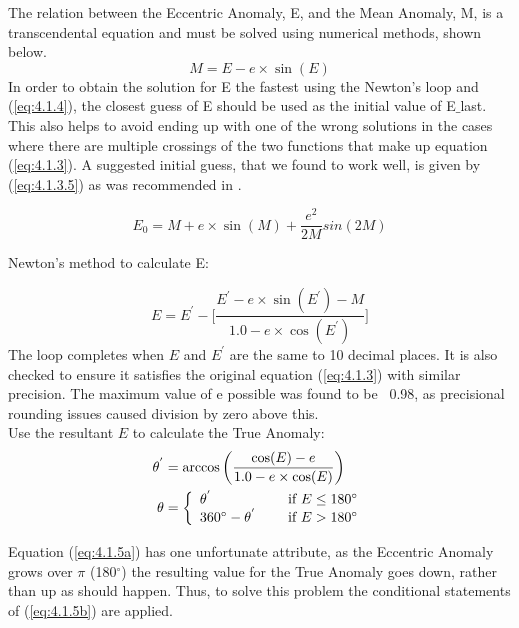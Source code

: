\documentclass[10pt,preprint]{aastex}
\begin{document}
The relation between the Eccentric Anomaly, E, and the Mean Anomaly, M, is a transcendental equation and must be solved using numerical methods, shown below.
\begin{equation}\label{eq:4.1.3}
M = E - e\times\sin(E)
\end{equation}
In order to obtain the solution for E the fastest using the Newton's loop and (\ref{eq:4.1.4}), the closest guess of E should be used as the initial value of E$\_$last.
  This also helps to avoid ending up with one of the wrong solutions in the
  cases where there are multiple crossings of the two functions that make up
  equation (\ref{eq:4.1.3}).  A suggested initial guess, that we found to work well, is given by (\ref{eq:4.1.3.5}) as was recommended in \citet{Argyle}.

\begin{equation}\label{eq:4.1.3.5}
E_0 = M+e\times\sin(M) + \frac{e^2}{2M}sin(2M)
\end{equation}

Newton's method to calculate E:
  
\begin{equation}\label{eq:4.1.4}
E = E^{'} - \bigg[\frac{E^{'} - e \times \sin(E^{'}) - M}{1.0 - e \times \cos(E^{'})}\bigg]
\end{equation}
The loop completes when $E$ and $E^{'}$ are the same to 10 decimal places.  It is also checked to ensure it satisfies the original equation (\ref{eq:4.1.3}) with similar precision.  The maximum value of e possible was found to be ~0.98, as precisional rounding issues caused division by zero above this.\\

Use the resultant $E$ to calculate the True Anomaly:
\begin{subequations}
\begin{align}
\label{eq:4.1.5a}
\theta^{'}& = \arccos \bigg( \frac{\cos(E) - e}{1.0 - e \times \cos(E)} \bigg)\\
\label{eq:4.1.5b}
\theta& = \left\{ \begin{array}{l l} \theta^{'}& \quad \text{ if $E\leq 180^{\circ}$}\\ 360^{\circ}  - \theta^{'}& \quad \text{ if $E > 180^{\circ}$} \end{array}\right.
\end{align}
\end{subequations}

Equation (\ref{eq:4.1.5a}) has one unfortunate attribute, as the Eccentric Anomaly grows over $\pi$ (180$^{\circ}$) the resulting value for the True Anomaly goes down, rather than up as should happen.  Thus, to solve this problem the conditional statements of (\ref{eq:4.1.5b}) are applied.\\ 
\end{document}
